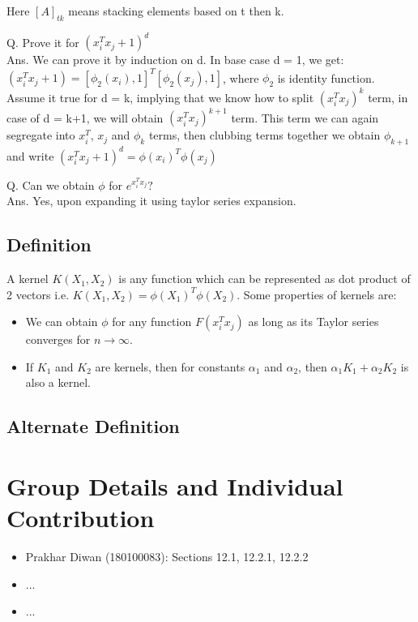 \documentclass[11pt, twosides]{article}
\begin{document}
Here $[A]_{tk}$ means stacking elements based on t then k.
\begin{flushleft}
\color{blue}
Q. Prove it for $(x_{i}^Tx_j + 1)^d$ \\
Ans. We can prove it by induction on d. In base case d = 1, we get: $(x_{i}^Tx_j + 1) = [\phi_2(x_i), 1]^T[\phi_2(x_j), 1]$, where $\phi_2$ is identity function. Assume it true for d = k, implying that we know how to split $(x_{i}^Tx_j)^k$ term, in case of d = k+1, we will obtain $(x_{i}^Tx_j)^{k+1}$ term. This term we can again segregate into $x_{i}^T$, $x_j$ and $\phi_{k}$ terms, then clubbing terms together we obtain $\phi_{k+1}$ and write $(x_{i}^Tx_j + 1)^d = \phi(x_i)^T\phi(x_j)$

Q. Can we obtain $\phi$ for $e^{x_{i}^Tx_j} ?$ \\
Ans. Yes, upon expanding it using taylor series expansion. 
\end{flushleft}
\subsection{Definition}
A kernel $K(X_1,X_2)$ is any function which can be represented as dot product of 2 vectors i.e. $K(X_1,X_2) = \phi(X_{1})^T \phi(X_2)$. Some properties of kernels are: 
\begin{itemize}
    \item We can obtain $\phi$ for any function $F(x_{i}^Tx_{j})$ as long as its Taylor series converges for $n \to \infty$.
    \item If $K_{1}$ and $K_{2}$ are kernels, then for constants $\alpha_1$ and $\alpha_2$, then  $\alpha_{1}K_{1}+\alpha_{2}K_{2}$ is also a kernel. 
\end{itemize}
\subsection{Alternate Definition}
\section{Group Details and Individual Contribution}
\begin{itemize}
    \item Prakhar Diwan (180100083): Sections 12.1, 12.2.1, 12.2.2
    \item ...
    \item ...
\end{itemize}
\end{document}
